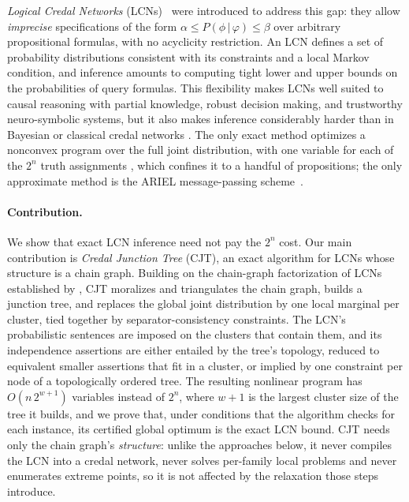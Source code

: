 \documentclass{article} %
\DeclareRobustCommand{\rev}[1]{{\color{blue}#1}}
\begin{document}
\emph{Logical Credal Networks} (LCNs)~\citep{marinescu2022neurips} were introduced to address this gap: they allow \emph{imprecise} specifications of the form $\alpha \leq P(\phi\,|\,\varphi) \leq \beta$ over arbitrary propositional formulas, with no acyclicity restriction. An LCN defines a set of probability distributions consistent with its constraints and a local Markov condition, and inference amounts to computing tight lower and upper bounds on the probabilities of query formulas. This flexibility makes LCNs well suited to causal reasoning with partial knowledge, robust decision making, and trustworthy neuro-symbolic systems, but it also makes inference considerably harder than in Bayesian or classical credal networks \citep{pearl88,cozman2000credal}. The only exact method optimizes a nonconvex program over the full joint distribution, with one variable for each of the $2^n$ truth assignments \citep{marinescu2022neurips}, which confines it to a handful of propositions; the only approximate method is the ARIEL message-passing scheme~\citep{marinescu2023lcn}.

\paragraph{Contribution.}
\rev{We show that exact LCN inference need not pay the $2^n$ cost. Our main contribution is \emph{Credal Junction Tree} (CJT), an exact algorithm for LCNs whose structure is a chain graph. Building on the chain-graph factorization of LCNs established by \citet{cozman23a}, CJT moralizes and triangulates the chain graph, builds a junction tree, and replaces the global joint distribution by one local marginal per cluster, tied together by separator-consistency constraints. The LCN's probabilistic sentences are imposed on the clusters that contain them, and its independence assertions are either entailed by the tree's topology, reduced to equivalent smaller assertions that fit in a cluster, or implied by one constraint per node of a topologically ordered tree. The resulting nonlinear program has $O(n\,2^{w+1})$ variables instead of $2^n$, where $w+1$ is the largest cluster size of the tree it builds, and we prove that, under conditions that the algorithm checks for each instance, its certified global optimum is the exact LCN bound. CJT needs only the chain graph's \emph{structure}: unlike the approaches below, it never compiles the LCN into a credal network, never solves per-family local problems and never enumerates extreme points, so it is not affected by the relaxation those steps introduce.}
\end{document}
